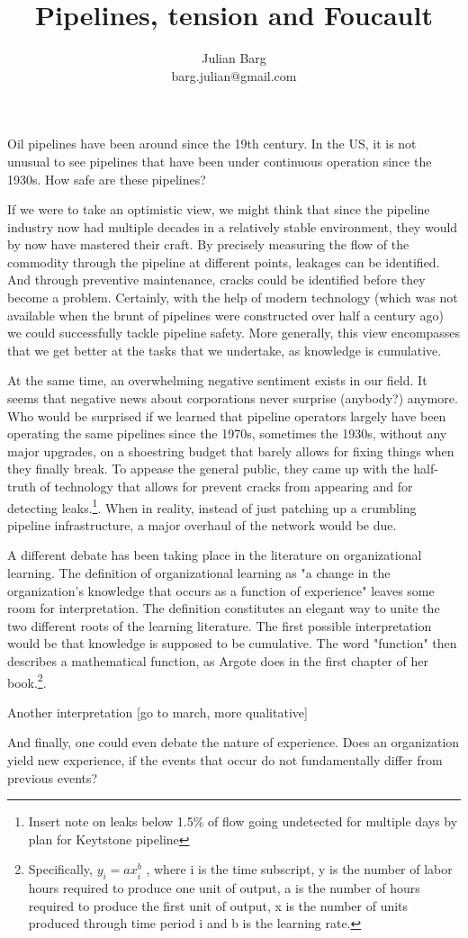 \documentclass[12pt, man, natbib]{apa6}
\title{Pipelines, tension and Foucault}
\author{Julian Barg\\barg.julian@gmail.com}
\affiliation{Ivey Business School}
\begin{document}
	
	\maketitle
	
	\singlespacing
	
	\section{}	

	Oil pipelines have been around since the 19th century. In the US, it is not unusual to see pipelines that have been under continuous operation since the 1930s. How safe are these pipelines? 
	
	If we were to take an optimistic view, we might think that since the pipeline industry now had multiple decades in a relatively stable environment, they would by now have mastered their craft. By precisely measuring the flow of the commodity through the pipeline at different points, leakages can be identified. And through preventive maintenance, cracks could be identified before they become a problem. Certainly, with the help of modern technology (which was not available when the brunt of pipelines were constructed over half a century ago) we could successfully tackle pipeline safety. More generally, this view encompasses that we get better at the tasks that we undertake, as knowledge is cumulative.
	
	At the same time, an overwhelming negative sentiment exists in our field. It seems that negative news about corporations never surprise (anybody?) anymore. Who would be surprised if we learned that pipeline operators largely have been operating the same pipelines since the 1970s, sometimes the 1930s, without any major upgrades, on a shoestring budget that barely allows for fixing things when they finally break. To appease the general public, they came up with the half-truth of technology that allows for prevent cracks from appearing and for detecting leaks.\footnote{Insert note on leaks below 1.5\% of flow going undetected for multiple days by plan for Keytstone pipeline}. When in reality, instead of just patching up a crumbling pipeline infrastructure, a major overhaul of the network would be due.
	
	A different debate has been taking place in the literature on organizational learning. The definition of organizational learning as "a change in the organization's knowledge that occurs as a function of experience" \citep[31]{Argote2013b} leaves some room for interpretation. The definition constitutes an elegant way to unite the two different roots of the learning literature. The first possible interpretation would be that knowledge is supposed to be cumulative. The word "function" then describes a mathematical function, as Argote does in the first chapter of her book.\footnote{Specifically, $y_i = ax^b_i$ \citep[11]{Argote2013a}, where i is the time subscript, y is the number of labor hours required to produce one unit of output, a is the number of hours required to produce the first unit of output, x is the number of units produced through time period i and b is the learning rate.}.

	Another interpretation [go to march, more qualitative]
	
	And finally, one could even debate the nature of experience. Does an organization yield new experience, if the events that occur do not fundamentally differ from previous events?


\end{document}
